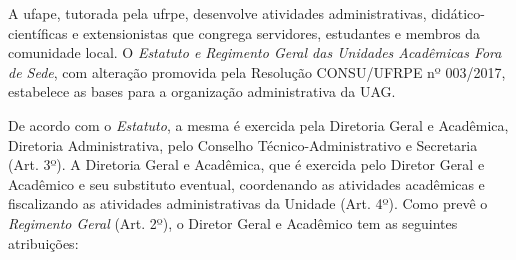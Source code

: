 \documentclass[
	12pt,				%
	openright,			%
  oneside,     %
	a4paper,			%
 hyphens,
	chapter=TITLE,		%
	english,			%
	french,				%
	spanish,			%
	brazil				%
	]{abntex2}
\begin{document}
A \acrshort{ufape}, tutorada pela \acrshort{ufrpe}, desenvolve atividades administrativas, didático-científicas e extensionistas que congrega servidores, estudantes e membros da comunidade local. O \textit{Estatuto e Regimento Geral das Unidades Acadêmicas Fora de Sede}, com alteração promovida pela Resolução CONSU/UFRPE nº 003/2017, estabelece as bases para a organização administrativa da UAG.

De acordo com o \textit{Estatuto}, a mesma é exercida pela Diretoria Geral e Acadêmica, Diretoria Administrativa, pelo Conselho Técnico-Administrativo e Secretaria (Art. 3º). A Diretoria Geral e Acadêmica, que é exercida pelo Diretor Geral e Acadêmico e seu substituto eventual, coordenando as atividades acadêmicas e fiscalizando as atividades administrativas da Unidade (Art. 4º). Como prevê o \textit{Regimento Geral} (Art. 2º), o Diretor Geral e Acadêmico tem as seguintes atribuições:
\end{document}

